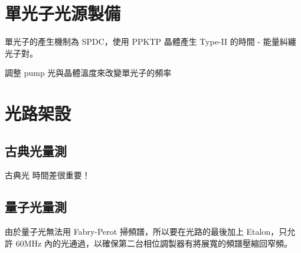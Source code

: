 \documentclass[class=NCU_thesis, crop=false]{standalone}
\begin{document}
\section{單光子光源製備}
單光子的產生機制為 SPDC，使用 PPKTP 晶體產生 Type-II 的時間 - 能量糾纏光子對。

調整 pump 光與晶體溫度來改變單光子的頻率

\section{光路架設}
\subsection{古典光量測}
古典光
時間差很重要！
\subsection{量子光量測}
由於量子光無法用 Fabry-Perot 掃頻譜，所以要在光路的最後加上 Etalon，只允許 60MHz 內的光通過，以確保第二台相位調製器有將展寬的頻譜壓縮回窄頻。
\end{document}
